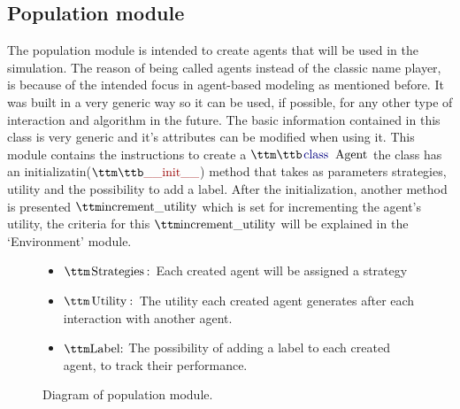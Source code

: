\subsection{Population module}
The population module is intended to create agents that will be used in the simulation. The reason of being called agents instead of the classic name player, is because of the intended focus in agent-based modeling as mentioned before. It was built in a very generic way so it can be used, if possible, for any other type of interaction and algorithm in the future. The basic information contained in this class is very generic and it's attributes can be modified when using it. 
This module contains the instructions to create a $\pythoninline{class Agent}$ the class has an initializatin($\pythoninline{__init__}$) method that takes as parameters strategies, utility and the possibility to add a label. After the initialization, another method is presented $\pythoninline{increment\_utility}$ which is set for incrementing the agent’s utility, the criteria for this $\pythoninline{increment\_utility}$ will be explained in the `Environment' module.

\begin{figure}[H]
\begin{center}
\begin{itemize}
	\item $\pythoninline{Strategies:}$ Each created agent will be assigned a strategy
	\item $\pythoninline{Utility:}$ The utility each created agent generates after each interaction with another agent.
	\item $\pythoninline{Label:}$ The possibility of adding a label to each created agent, to track their performance.
\end{itemize}
\caption{ Diagram of population module.}
\label{fig:diagage}
\end{center}
\end{figure}

